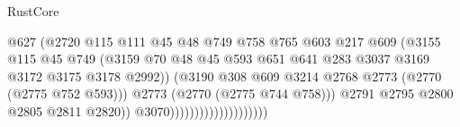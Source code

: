 \begin{lexlean}{RustCore}
\begin{coremodule}
                                                @627
                                                (@2720
                                                  @115
                                                  @111
                                                  @45
                                                  @48
                                                  @749
                                                  @758
                                                  @765
                                                  @603
                                                  @217
                                                  @609
                                                  (@3155
                                                    @115
                                                    @45
                                                    @749
                                                    (@3159
                                                      @70
                                                      @48
                                                      @45
                                                      @593
                                                      @651
                                                      @641
                                                      @283
                                                      @3037
                                                      @3169
                                                      @3172
                                                      @3175
                                                      @3178
                                                      @2992))
                                                  (@3190
                                                    @308
                                                    @609
                                                    @3214
                                                    @2768
                                                    @2773
                                                    (@2770 (@2775 @752 @593)))
                                                  @2773
                                                  (@2770 (@2775 @744 @758)))
                                                @2791
                                                @2795
                                                @2800
                                                @2805
                                                @2811
                                                @2820))
                                            @3070))))))))))))))))))))

\end{coremodule}
\end{lexlean}
